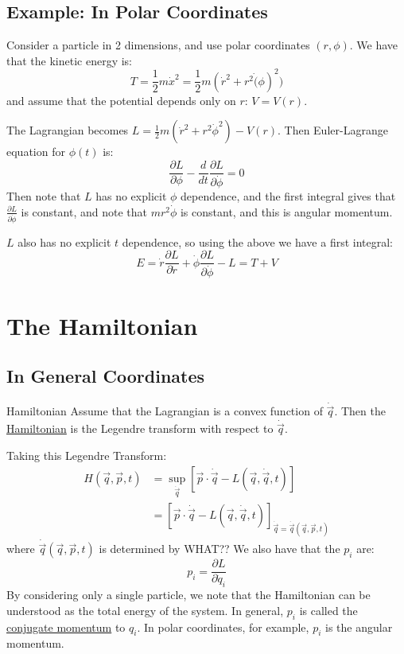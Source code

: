 \documentclass[../Main.tex]{subfiles}
\begin{document}
\subsection{Example: In Polar Coordinates}
Consider a particle in 2 dimensions, and use polar coordinates $(r, \phi)$. We have that the kinetic energy is:
\begin{equation*}
    T = \frac{1}{2} m \dot{x}^2 = \frac{1}{2} m (\dot{r}^2 + r^2 \dot(\phi)^2)
\end{equation*}
and assume that the potential depends only on $r$: $V = V(r)$.

The Lagrangian becomes $L = \frac{1}{2} m (\dot{r}^2 + r^2 \dot{\phi}^2) - V(r)$. Then Euler-Lagrange equation for $\phi(t)$ is:
\begin{equation*}
    \frac{\partial L}{\partial \phi} - \frac{d}{dt} \frac{\partial L}{\partial \dot{\phi}} = 0
\end{equation*}
Then note that $L$ has no explicit $\phi$ dependence, and the first integral gives that $\frac{\partial L}{\partial \dot{\phi}}$ is constant, and note that $m r^2 \dot{\phi}$ is constant, and this is angular momentum.

$L$ also has no explicit $t$ dependence, so using the above we have a first integral:
\begin{equation*}
    E = \dot{r} \frac{\partial L}{\partial \dot{r}} + \dot{\phi} \frac{\partial L}{\partial \dot{\phi}} - L = T + V
\end{equation*}
\section{The Hamiltonian}
\subsection{In General Coordinates}
\begin{definition}{Hamiltonian}
    Assume that the Lagrangian is a convex function of $\dot{\vec{q}}$. Then the \underline{Hamiltonian} is the Legendre transform with respect to $\dot{\vec{q}}$.
\end{definition}
Taking this Legendre Transform:
\begin{align*}
    H(\vec{q}, \vec{p}, t) &= \sup_{\dot{\vec{q}}} \left[\vec{p} \cdot \dot{\vec{q}} - L(\vec{q}, \dot{\vec{q}}, t)\right] \\
    &= \left[\vec{p} \cdot \dot{\vec{q}} - L(\vec{q}, \dot{\vec{q}}, t)\right]_{\dot{\vec{q}} = \dot{\vec{q}}(\vec{q}, \vec{p}, t)}
\end{align*}
where $\dot{\vec{q}}(\vec{q}, \vec{p}, t)$ is determined by WHAT?? We also have that the $p_i$ are: %
\begin{equation*}
    p_i = \frac{\partial L}{\partial \dot{q}_i}
\end{equation*}
By considering only a single particle, we note that the Hamiltonian can be understood as the total energy of the system. In general, $p_i$ is called the \underline{conjugate momentum} to $q_i$. In polar coordinates, for example, $p_i$ is the angular momentum.
\end{document}
